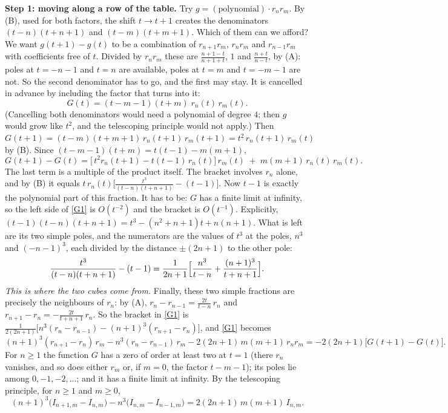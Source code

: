 \documentclass[11pt]{article}
\newcommand{\q}[1]{\medskip\noindent\textbf{#1}}
\begin{document}
\q{Step 1: moving along a row of the table.} Try $g=(\text{polynomial})\cdot r_nr_m$. By (B), used
for both factors, the shift $t\to t+1$ creates the denominators $(t-n)(t+n+1)$ and $(t-m)(t+m+1)$.
Which of them can we afford? We want $g(t+1)-g(t)$ to be a combination of $r_{n+1}r_m$, $r_nr_m$
and $r_{n-1}r_m$ with coefficients free of $t$. Divided by $r_nr_m$ these are
$\frac{n+1-t}{n+1+t}$, $1$ and $\frac{n+t}{n-t}$, by (A): poles at $t=-n-1$ and $t=n$ are available,
poles at $t=m$ and $t=-m-1$ are not. So the second denominator has to go, and the first may stay.
It is cancelled in advance by including the factor that turns into it:
\[
G(t)=(t-m-1)(t+m)\;r_n(t)\,r_m(t).
\]
(Cancelling both denominators would need a polynomial of degree $4$; then $g$ would grow like
$t^2$, and the telescoping principle would not apply.) Then
$G(t+1)=(t-m)(t+m+1)\,r_n(t+1)\,r_m(t+1)=t^2\,r_n(t+1)\,r_m(t)$ by (B). Since
$(t-m-1)(t+m)=t(t-1)-m(m+1)$,
\begin{equation}\label{G1}
G(t+1)-G(t)=\bigl[\,t^2r_n(t+1)-t(t-1)\,r_n(t)\bigr]\,r_m(t)\;+\;m(m+1)\,r_n(t)\,r_m(t).
\end{equation}
The last term is a multiple of the product itself. The bracket involves $r_n$ alone, and by (B) it
equals $t\,r_n(t)\bigl[\frac{t^3}{(t-n)(t+n+1)}-(t-1)\bigr]$. Now $t-1$ is exactly the polynomial
part of this fraction. It has to be: $G$ has a finite limit at infinity, so the left side of
\eqref{G1} is $O(t^{-2})$ and the bracket is $O(t^{-1})$. Explicitly,
$(t-1)(t-n)(t+n+1)=t^3-(n^2+n+1)t+n(n+1)$. What is left are its two
simple poles, and the numerators are the values of $t^3$ at the poles, $n^3$ and $(-n-1)^3$, each
divided by the distance $\pm(2n+1)$ to the other pole:
\begin{equation}\label{pf}
\frac{t^3}{(t-n)(t+n+1)}-(t-1)=\frac1{2n+1}\Bigl[\frac{n^3}{t-n}+\frac{(n+1)^3}{t+n+1}\Bigr].
\end{equation}
\emph{This is where the two cubes come from.} Finally, these two simple fractions are precisely the
neighbours of $r_n$: by (A), $r_n-r_{n-1}=\frac{2t}{t-n}\,r_n$ and
$r_{n+1}-r_n=-\frac{2t}{t+n+1}\,r_n$. So the bracket in \eqref{G1} is
$\frac1{2(2n+1)}\bigl[n^3(r_n-r_{n-1})-(n+1)^3(r_{n+1}-r_n)\bigr]$, and \eqref{G1} becomes
\begin{equation}\label{rowid}
(n+1)^3(r_{n+1}-r_n)\,r_m-n^3(r_n-r_{n-1})\,r_m-2(2n+1)\,m(m+1)\,r_nr_m=-2(2n+1)\bigl[G(t+1)-G(t)\bigr].
\end{equation}
For $n\ge1$ the function $G$ has a zero of order at least two at $t=1$ (there $r_n$ vanishes, and
so does either $r_m$ or, if $m=0$, the factor $t-m-1$); its poles lie among $0,-1,-2,\dots$; and
it has a finite limit at infinity. By the telescoping
principle, for $n\ge1$ and $m\ge0$,
\begin{equation}\label{R}
(n+1)^3\bigl(I_{n+1,m}-I_{n,m}\bigr)-n^3\bigl(I_{n,m}-I_{n-1,m}\bigr)=2(2n+1)\,m(m+1)\,I_{n,m}.
\end{equation}
\end{document}
